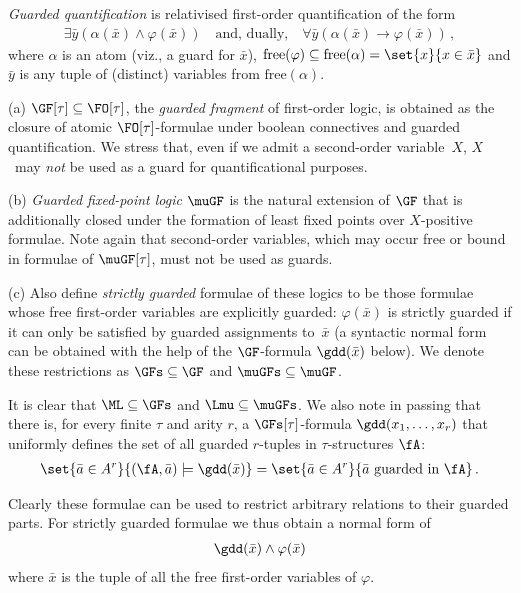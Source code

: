 \documentclass{LMCS}
\begin{document}
\emph{Guarded quantification} is relativised first-order quantification
of the form
\begin{align*}
  \exists \bar y ( \alpha(\bar x) \land \varphi(\bar x) )
  \quad\text{and, dually,}\quad
  \forall \bar y ( \alpha(\bar x) \to \varphi(\bar x) )\,,
\end{align*}
where $\alpha$ is an atom (viz., a guard for $\bar{x}$),
$\mathrm{free}(\varphi) \subseteq \mathrm{free}(\alpha) = \set{x}{x \in \bar x}$
and $\bar y$ is any
tuple of (distinct) variables from $\mathrm{free}(\alpha)$.


\begin{defi}
\textup{(a)}
$\GF[\tau] \subseteq \FO[\tau]$, the \emph{guarded fragment}
of first-order logic, is obtained as the closure of
atomic $\FO[\tau]$-formulae under boolean connectives and
guarded quantification. We stress that, even if we admit a
second-order variable~$X$, $X$~may \emph{not} be used as
a guard for quantificational purposes.

\textup{(b)}
\emph{Guarded fixed-point logic} $\muGF$ is the natural extension
of $\GF$ that is additionally closed under the formation of
least fixed points over $X$-positive formulae.
Note again that second-order variables, which may
occur free or bound in formulae of $\muGF[\tau]$,
must not be used as guards.

\textup{(c)}
Also define \emph{strictly guarded} formulae of these logics to be those
formulae whose free first-order variables are explicitly guarded\?:
$\varphi(\bar x)$ is strictly guarded if it can only be satisfied by
guarded assignments to~$\bar x$ (a syntactic normal form can be
obtained with the help of the $\GF$-formula $\gdd(\bar x)$ below).
We denote these restrictions as $\GFs \subseteq \GF$ and $\muGFs \subseteq \muGF$.
\end{defi}


It is clear that $\ML \subseteq \GFs$ and $\Lmu \subseteq \muGFs$.
We also note in passing that there is, for every finite $\tau$ and arity $r$,
a $\GFs[\tau]$-formula
$\gdd(x_1,\dots, x_r)$ that uniformly defines the set of all
guarded $r$-tuples in $\tau$-structures $\fA$\?:
\begin{align*}
    \set{ \bar{a} \in A^r }{ (\fA,\bar{a}) \models \gdd(\bar{x}) }
  = \set{ \bar{a} \in A^r }{ \bar{a} \text{ guarded in } \fA }\,.
\end{align*}

Clearly these formulae can be used to restrict arbitrary
relations to their guarded parts.
For strictly guarded formulae we thus obtain a normal form of
\begin{align*}
  \gdd(\bar x) \wedge \varphi(\bar x)
\end{align*}
where $\bar x$ is the tuple
of all the free first-order variables of $\varphi$.
\end{document}
